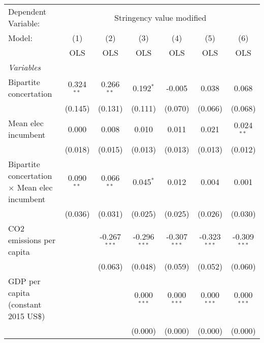 
\begingroup
\centering
\begin{tabular}{lcccccc}
   \toprule
   Dependent Variable: & \multicolumn{6}{c}{Stringency value modified}\\
   Model:                                               & (1)          & (2)            & (3)            & (4)            & (5)            & (6)\\  
                                                        &  OLS         & OLS            & OLS            & OLS            & OLS            & OLS\\  
   \midrule
   \emph{Variables}\\
   Bipartite concertation                               & 0.324$^{**}$ & 0.266$^{**}$   & 0.192$^{*}$    & -0.005         & 0.038          & 0.068\\   
                                                        & (0.145)      & (0.131)        & (0.111)        & (0.070)        & (0.066)        & (0.068)\\   
   Mean elec incumbent                                  & 0.000        & 0.008          & 0.010          & 0.011          & 0.021          & 0.024$^{**}$\\   
                                                        & (0.018)      & (0.015)        & (0.013)        & (0.013)        & (0.013)        & (0.012)\\   
   Bipartite concertation $\times$ Mean elec incumbent  & 0.090$^{**}$ & 0.066$^{**}$   & 0.045$^{*}$    & 0.012          & 0.004          & 0.001\\   
                                                        & (0.036)      & (0.031)        & (0.025)        & (0.025)        & (0.026)        & (0.030)\\   
   CO2 emissions per capita                             &              & -0.267$^{***}$ & -0.296$^{***}$ & -0.307$^{***}$ & -0.323$^{***}$ & -0.309$^{***}$\\   
                                                        &              & (0.063)        & (0.048)        & (0.059)        & (0.052)        & (0.060)\\   
   GDP per capita (constant 2015 US\$)                  &              &                & 0.000$^{***}$  & 0.000$^{***}$  & 0.000$^{***}$  & 0.000$^{***}$\\   
                                                        &              &                & (0.000)        & (0.000)        & (0.000)        & (0.000)\\   

\end{tabular}
